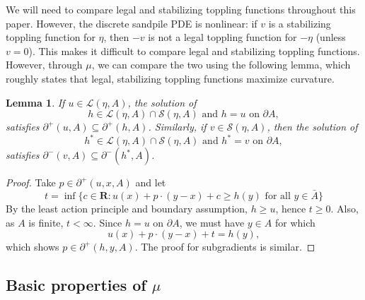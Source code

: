 \documentclass[12pt]{amsart}
\newcommand{\R}{\mathbf{R}}
\newtheorem{lemma}[theorem]{Lemma}
\begin{document}
We will need to compare legal and stabilizing toppling functions throughout this paper. However, the discrete sandpile PDE is nonlinear:  
if $v$ is a stabilizing toppling function for $\eta$, then $-v$ is not a legal toppling function for $-\eta$ (unless $v = 0$).  This makes 
it difficult to compare legal and stabilizing toppling functions. However, through $\mu$, we can compare the two using the following lemma, which roughly states that legal, stabilizing 
toppling functions maximize curvature. 

\begin{lemma} \label{stabilizing-legal}
If $u \in \mathcal{L}(\eta, A)$, the solution of
\[
h \in \mathcal{L}(\eta, A) \cap  \mathcal{S}(\eta, A) \mbox{ and $h = u$ on $\partial A$}, 
\]
satisfies $\partial^+(u, A) \subseteq \partial^+(h, A)$. Similarly, if $v \in \mathcal{S}(\eta, A)$, then the solution of 
 \[
h^* \in \mathcal{L}(\eta, A) \cap  \mathcal{S}(\eta, A) \mbox{ and $h^* = v$ on $\partial A$}, 
 \]
 satisfies $\partial^-(v, A) \subseteq \partial^-(h^*, A)$.
 \end{lemma}

\begin{proof}
Take $p \in \partial^+(u,x,A)$ and let
\[
t = \inf \{ c \in \R: u(x) + p \cdot(y-x) + c \geq h(y) \mbox{ for all $y \in \bar{A}$} \}
\]
By the least action principle and boundary assumption, $h \geq u$, hence $t \geq 0$. 
Also, as $A$ is finite, $t < \infty$. Since $h= u$ on $\partial A$, 
we must have $y \in A$ for which 
\[
u(x) + p \cdot(y-x) + t = h(y) , 
\]
which shows $p \in \partial^+(h, y, A)$. The proof for subgradients is similar. 
\end{proof}



\subsection{Basic properties of $\mu$}
\end{document}
